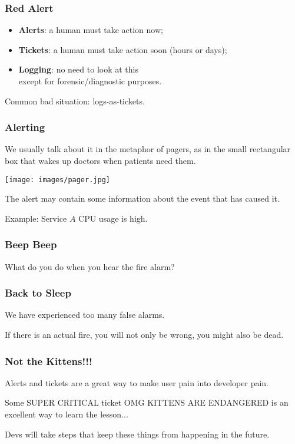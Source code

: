 \begin{frame}
\frametitle{Red Alert}


\begin{itemize}
\item {\bf Alerts}: a human must take action now;
\item {\bf Tickets}: a human must take action soon  (hours or days);
\item {\bf Logging}: no need to look at this \\ \qquad except for forensic/diagnostic purposes.
\end{itemize}


Common bad situation: logs-as-tickets.
\end{frame}



\begin{frame}
\frametitle{Alerting}

 We usually talk about it in the metaphor of pagers, as in the small rectangular box that wakes up doctors when patients need them.
 
 \begin{center}
	\texttt{[image: images/pager.jpg]}
\end{center}

The alert may contain some information about the event that has caused it.

Example: Service $A$ CPU usage is high.

\end{frame}


\begin{frame}
\frametitle{Beep Beep}

\large

What do you do when you hear the fire alarm?

\end{frame}


\begin{frame}
\frametitle{Back to Sleep}

We have experienced too many false alarms.


If there is an actual fire, you will not only be wrong, you might also be dead.
\end{frame}


\begin{frame}
\frametitle{Not the Kittens!!!}

Alerts and tickets are a great way to make user pain into developer pain.

Some SUPER CRITICAL ticket OMG KITTENS ARE ENDANGERED is an excellent way to learn the lesson... 

Devs will take steps that keep these things from happening in the future.
\end{frame}


